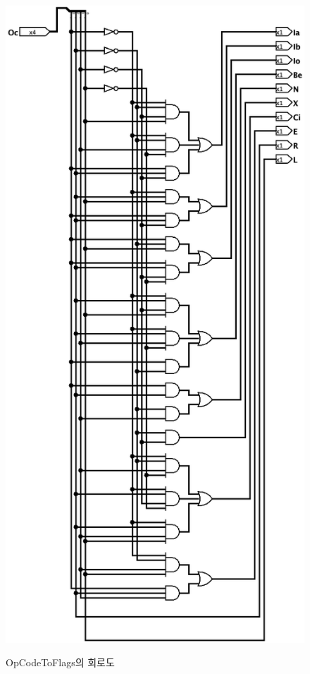 \documentclass{article}
\begin{document}
\begin{figure}[p]
    \centering
    \includegraphics[scale=0.35]{OpCodeToFlags} \\
    \caption{OpCodeToFlags의 회로도}
    \label{fig:octf}
\end{figure}
\end{document}
